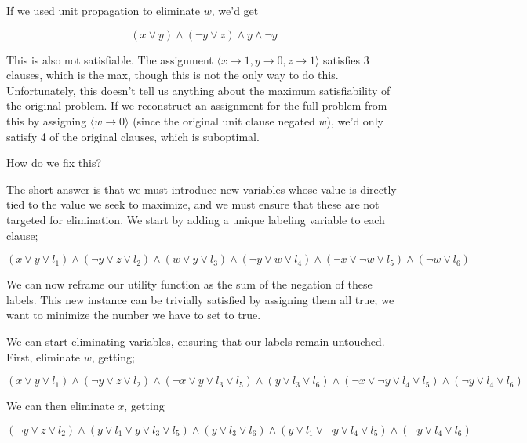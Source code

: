 If we used unit propagation to eliminate $w$, we'd get

\begin{equation}
    (x \vee y) \wedge (\neg y \vee z) \wedge y \wedge \neg y
\end{equation}

This is also not satisfiable. The assignment $\langle x \rightarrow 1, y \rightarrow 0, z \rightarrow 1 \rangle$ satisfies 3 clauses, which is the max, though this is not the only way to do this. Unfortunately, this doesn't tell us anything about the maximum satisfiability of the original problem. If we reconstruct an assignment for the full problem from this by assigning $\langle w \rightarrow 0 \rangle$ (since the original unit clause negated $w$), we'd only satisfy 4 of the original clauses, which is suboptimal.

How do we fix this?

The short answer is that we must introduce new variables whose value is directly tied to the value we seek to maximize, and we must ensure that these are not targeted for elimination. We start by adding a unique labeling variable to each clause;

\begin{equation}
    (x \vee y \vee l_1) \wedge (\neg y \vee z \vee l_2) \wedge (w \vee y \vee l_3) \wedge (\neg y \vee w \vee l_4) \wedge (\neg x \vee \neg w \vee l_5) \wedge (\neg w \vee l_6)
\end{equation}

We can now reframe our utility function as the sum of the negation of these labels. This new instance can be trivially satisfied by assigning them all true; we want to minimize the number we have to set to true.

We can start eliminating variables, ensuring that our labels remain untouched. First, eliminate $w$, getting;

\begin{equation}
    (x \vee y \vee l_1) \wedge (\neg y \vee z \vee l_2) \wedge (\neg x\lor y\lor l_3\lor l_5)\land (y\lor l_3\lor l_6)\land (\neg x\lor \neg y\lor l_4\lor l_5)\land (\neg y\lor l_4\lor l_6)
\end{equation}

We can then eliminate $x$, getting

\begin{equation}
(\neg y\lor z\lor l_2)\land (y\lor l_1\lor y\lor l_3\lor l_5)\land (y\lor l_3\lor l_6)\land (y\lor l_1\lor \neg y\lor l_4\lor l_5)\land (\neg y\lor l_4\lor l_6)
\end{equation}

